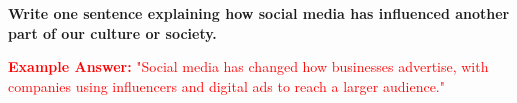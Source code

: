 \documentclass[12pt]{article}
\begin{document}
\vspace{1cm}

\begin{tcolorbox}[colframe=black!60, colback=white, 
coltitle=black, colbacktitle=black!15, fonttitle=\bfseries\Large, 
title=Exit Ticket, halign title=center, left=10pt, right=10pt, top=5pt, bottom=15pt]
\textbf{Write one sentence explaining how social media has influenced another part of our culture or society.}

\textcolor{red}{\textbf{Example Answer:}} \textcolor{red}{"Social media has changed how businesses advertise, with companies using influencers and digital ads to reach a larger audience."}
\end{tcolorbox}
\end{document}
